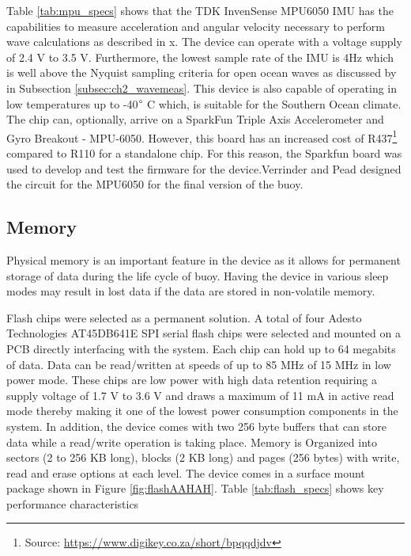 Table \ref{tab:mpu_specs} shows that the TDK InvenSense MPU6050 IMU has the capabilities to measure acceleration and angular velocity necessary to perform wave calculations as described in x. The device can operate with a voltage supply of 2.4 V to 3.5 V. Furthermore, the lowest sample rate of the IMU is 4Hz which is well above the Nyquist sampling criteria for open ocean waves as discussed by \textcite{earle1996nondirectional} in Subsection \ref{subsec:ch2_wavemeas}. This device is also capable of operating in low temperatures up to -40$\degree$ C which, is suitable for the Southern Ocean climate. The chip can, optionally, arrive on a  SparkFun Triple Axis Accelerometer and Gyro Breakout - MPU-6050. However, this board has an increased cost of R437\footnote{Source: \url{https://www.digikey.co.za/short/bpqqdjdv}} compared to R110 for a standalone chip. For this reason, the Sparkfun board was used to develop and test the firmware for the device.Verrinder and Pead designed the circuit for the MPU6050 for the final version of the buoy.

\subsection{Memory}
\label{subsec:ch3_mem}
Physical memory is an important feature in the device as it allows for permanent storage of data during the life cycle of buoy. Having the device in various sleep modes may result in lost data if the data are stored in non-volatile memory.

Flash chips were selected as a permanent solution. A total of four Adesto Technologies AT45DB641E SPI serial flash chips \cite{AT45DB641E} were selected and mounted on a PCB directly interfacing with the system. Each chip can hold up to 64 megabits of data. Data can be read/written at speeds of up to 85 MHz of 15 MHz in low power mode. These chips are low power with high data retention requiring a supply voltage of 1.7 V to 3.6 V and draws a maximum of 11 mA in active read mode thereby making it one of the lowest power consumption components in the system. In addition, the device comes with two 256 byte buffers that can store data while a read/write operation is taking place. Memory is Organized into sectors (2 to 256 KB long), blocks (2 KB long) and pages (256 bytes) with write, read and erase options at each level. The device comes in a surface mount package shown in Figure \ref{fig:flashAAHAH}. Table \ref{tab:flash_specs} shows key performance characteristics

